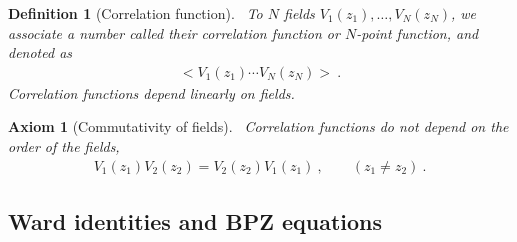 \documentclass[12pt, a4paper]{article}
\theoremstyle{break}
\newtheorem{hyp}[exo]{Axiom}
\newtheorem{defn}[exo]{Definition}
\begin{document}
\begin{defn}[Correlation function]
~\label{def:cor}
 To $N$ fields $V_1(z_1), \dots ,V_N(z_N)$, we associate a number called their correlation function or $N$-point function, and denoted as 
 \begin{align}
  \Big< V_1(z_1) \cdots V_N(z_N) \Big>\ .
 \end{align}
Correlation functions depend linearly on fields.
\end{defn}

\begin{hyp}[Commutativity of fields]
 ~\label{hyp:ass}
 Correlation functions do not depend on the order of the fields,
 \begin{align}
  V_1(z_1) V_2(z_2) = V_2(z_2)V_1(z_1)\ , \qquad (z_1\neq z_2)\ .
 \end{align}
\end{hyp}

\subsection{Ward identities and BPZ equations}
\end{document}
